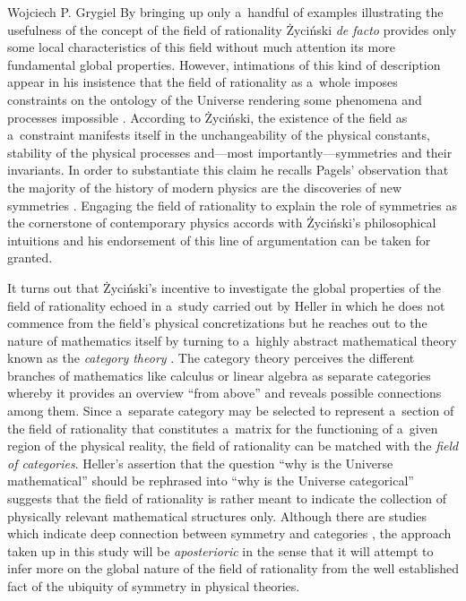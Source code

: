 \begin{artengenv}{Wojciech P. Grygiel}
By bringing up only a~handful of examples illustrating the usefulness of the concept of the field of rationality Życiński \textit{de facto} provides only some local characteristics of this field without much attention its more fundamental global properties. However, intimations of this kind of description appear in his insistence that the field of rationality as a~whole imposes constraints on the ontology of the Universe rendering some phenomena and processes impossible 
\parencite[][p.180]{zycinski_filozoficzne_1987}. %
 According to Życiński, the existence of the field as a~constraint manifests itself in the unchangeability of the physical constants, stability of the physical processes and---most importantly---symmetries and their invariants. In order to substantiate this claim he recalls Pagels' observation that the majority of the history of modern physics are the discoveries of new symmetries 
\parencite[][p.296]{pagels_cosmic_1983}. %
 Engaging the field of rationality to explain the role of symmetries as the cornerstone of contemporary physics accords with Życiński's philosophical intuitions and his endorsement of this line of argumentation can be taken for granted.



It turns out that Życiński's incentive to investigate the global properties of the field of rationality echoed in a~study carried out by Heller in which he does not commence from the field's physical concretizations but he reaches out to the nature of mathematics itself by turning to a~highly abstract mathematical theory known as the \textit{category theory} 
\parencite[][]{heller_field_2014}. %
 The category theory perceives the different branches of mathematics like calculus or linear algebra as separate categories whereby it provides an overview ``from above'' and reveals possible connections among them. Since a~separate category may be selected to represent a~section of the field of rationality that constitutes a~matrix for the functioning of a~given region of the physical reality, the field of rationality can be matched with the \textit{field of categories}. Heller's assertion that the question ``why is the Universe mathematical'' should be rephrased into ``why is the Universe categorical'' suggests that the field of rationality is rather meant to indicate the collection of physically relevant mathematical structures only. Although there are studies which indicate deep connection between symmetry and categories 
\parencite[e.g][]{heunen_principle_2008}, %
 the approach taken up in this study will be \textit{aposterioric} in the sense that it will attempt to infer more on the global nature of the field of rationality from the well established fact of the ubiquity of symmetry in physical theories.




\end{artengenv}
